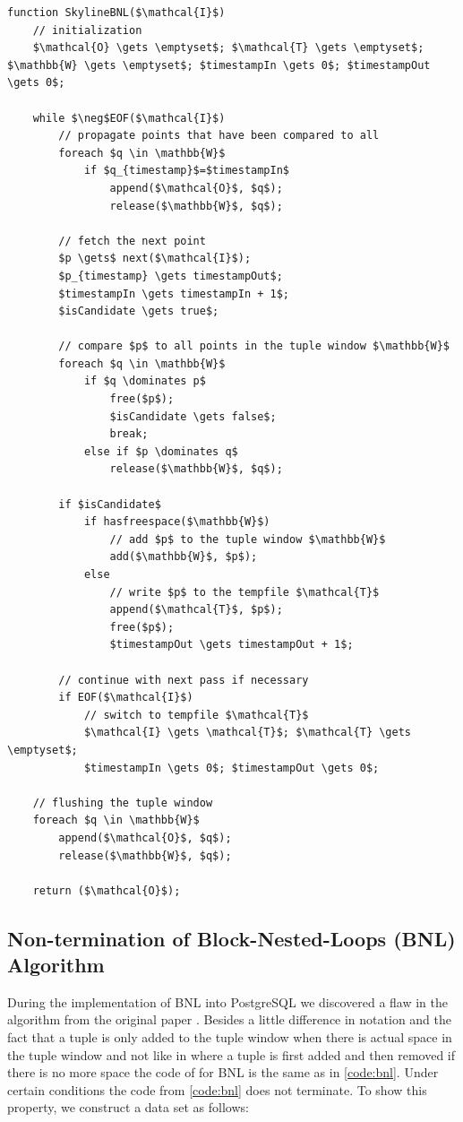 \begin{lstlisting}[language=pseudo, 
caption={Pseudo-code for Original Block-Nested-Loops (BNL) Algorithm, which does not terminate in all cases.},
label={code:bnl}]
function SkylineBNL($\mathcal{I}$)
	// initialization
	$\mathcal{O} \gets \emptyset$; $\mathcal{T} \gets \emptyset$; $\mathbb{W} \gets \emptyset$; $timestampIn \gets 0$; $timestampOut \gets 0$;

	while $\neg$EOF($\mathcal{I}$)
		// propagate points that have been compared to all
		foreach $q \in \mathbb{W}$
			if $q_{timestamp}$=$timestampIn$
				append($\mathcal{O}$, $q$);
				release($\mathbb{W}$, $q$);

		// fetch the next point
		$p \gets$ next($\mathcal{I}$);
		$p_{timestamp} \gets timestampOut$;
		$timestampIn \gets timestampIn + 1$;
		$isCandidate \gets true$;

		// compare $p$ to all points in the tuple window $\mathbb{W}$
		foreach $q \in \mathbb{W}$
			if $q \dominates p$
				free($p$);
				$isCandidate \gets false$;
				break;
			else if $p \dominates q$
				release($\mathbb{W}$, $q$);

		if $isCandidate$
			if hasfreespace($\mathbb{W}$)
				// add $p$ to the tuple window $\mathbb{W}$
				add($\mathbb{W}$, $p$);
			else
				// write $p$ to the tempfile $\mathcal{T}$
				append($\mathcal{T}$, $p$);
				free($p$);
				$timestampOut \gets timestampOut + 1$;

		// continue with next pass if necessary
		if EOF($\mathcal{I}$)
			// switch to tempfile $\mathcal{T}$
			$\mathcal{I} \gets \mathcal{T}$; $\mathcal{T} \gets \emptyset$;
			$timestampIn \gets 0$; $timestampOut \gets 0$;

	// flushing the tuple window
	foreach $q \in \mathbb{W}$
		append($\mathcal{O}$, $q$);
		release($\mathbb{W}$, $q$);

	return ($\mathcal{O}$);
\end{lstlisting}


\subsection{Non-termination of Block-Nested-Loops (BNL) Algorithm}
During the implementation of BNL into PostgreSQL we discovered a flaw in
the algorithm from the original paper \citep{Borzsonyi2001}.  
Besides
a little difference in notation and the fact that a tuple is only
added to the tuple window when there is actual space in the tuple
window and not like in \citep{Borzsonyi2001} where a tuple is first
added and then removed if there is no more space the code of
\citep{Borzsonyi2001} for BNL is the same as in \autoref{code:bnl}.
Under certain conditions the code from \autoref{code:bnl} does not
terminate.  To show this property, we construct a data set as follows:

